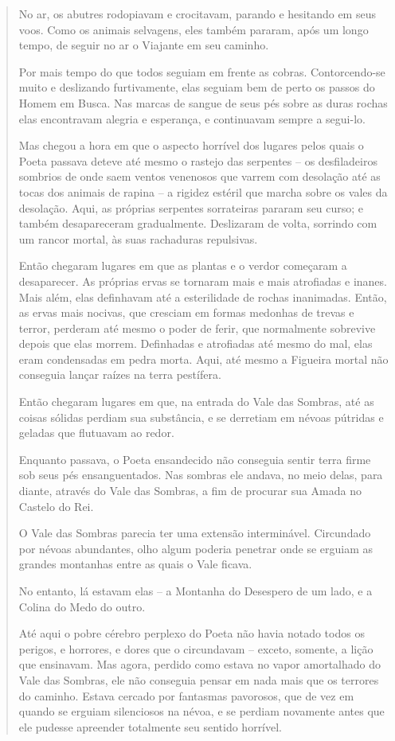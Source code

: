 \begin{verse}
No ar, os abutres rodopiavam e crocitavam, parando e hesitando em seus
voos. Como os animais selvagens, eles também pararam, após um longo
tempo, de seguir no ar o Viajante em seu caminho.

Por mais tempo do que todos seguiam em frente as cobras. Contorcendo-se
muito e deslizando furtivamente, elas seguiam bem de perto os passos do
Homem em Busca. Nas marcas de sangue de seus pés sobre as duras rochas
elas encontravam alegria e esperança, e continuavam sempre a segui-lo.

Mas chegou a hora em que o aspecto horrível dos lugares pelos quais o
Poeta passava deteve até mesmo o rastejo das serpentes -- os
desfiladeiros sombrios de onde saem ventos venenosos que varrem com
desolação até as tocas dos animais de rapina -- a rigidez estéril que
marcha sobre os vales da desolação. Aqui, as próprias serpentes
sorrateiras pararam seu curso; e também desapareceram gradualmente.
Deslizaram de volta, sorrindo com um rancor mortal, às suas rachaduras
repulsivas.

Então chegaram lugares em que as plantas e o verdor começaram a
desaparecer. As próprias ervas se tornaram mais e mais atrofiadas e
inanes. Mais além, elas definhavam até a esterilidade de rochas
inanimadas. Então, as ervas mais nocivas, que cresciam em formas
medonhas de trevas e terror, perderam até mesmo o poder de ferir, que
normalmente sobrevive depois que elas morrem. Definhadas e atrofiadas
até mesmo do mal, elas eram condensadas em pedra morta. Aqui, até mesmo
a Figueira mortal não conseguia lançar raízes na terra pestífera.

Então chegaram lugares em que, na entrada do Vale das Sombras, até as
coisas sólidas perdiam sua substância, e se derretiam em névoas pútridas
e geladas que flutuavam ao redor.

Enquanto passava, o Poeta ensandecido não conseguia sentir terra firme
sob seus pés ensanguentados. Nas sombras ele andava, no meio delas,
para diante, através do Vale das Sombras, a fim de procurar sua Amada no
Castelo do Rei.

O Vale das Sombras parecia ter uma extensão interminável. Circundado por
névoas abundantes, olho algum poderia penetrar onde se erguiam as
grandes montanhas entre as quais o Vale ficava.

No entanto, lá estavam elas -- a Montanha do Desespero de um lado, e a
Colina do Medo do outro.

Até aqui o pobre cérebro perplexo do Poeta não havia notado todos os
perigos, e horrores, e dores que o circundavam -- exceto, somente, a
lição que ensinavam. Mas agora, perdido como estava no vapor amortalhado
do Vale das Sombras, ele não conseguia pensar em nada mais que os
terrores do caminho. Estava cercado por fantasmas pavorosos, que de vez
em quando se erguiam silenciosos na névoa, e se perdiam novamente antes
que ele pudesse apreender totalmente seu sentido horrível.


\end{verse}
